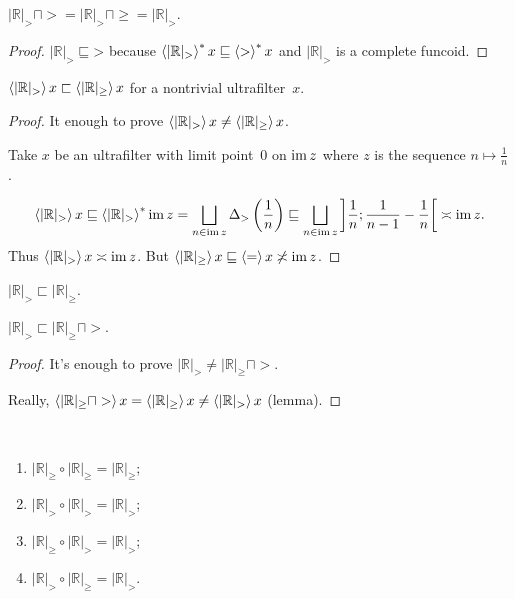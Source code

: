 \begin{prop}
$| \mathbb{R} |_{>} \sqcap > = | \mathbb{R} |_{>} \sqcap \geq = | \mathbb{R} |_{>}$.
\end{prop}

\begin{proof}
$| \mathbb{R} |_{>} \sqsubseteq \mathord{>}$ because $\left\langle | \mathbb{R} |_{>}\right\rangle ^{\ast} x \sqsubseteq \left\langle >\right\rangle ^{\ast} x$ and
$| \mathbb{R} |_{>}$ is a complete funcoid.
\end{proof}

\begin{lem}
$\left\langle  | \mathbb{R} |_{>} \right\rangle x \sqsubset \left\langle  | \mathbb{R} |_{\geq} \right\rangle x$ for a nontrivial ultrafilter~$x$.
\end{lem}

\begin{proof}
It enough to prove $\left\langle  | \mathbb{R} |_{>} \right\rangle x \ne \left\langle | \mathbb{R} |_{\geq} \right\rangle x$.

Take $x$ be an ultrafilter with limit point~$0$ on $\operatorname{im} z$ where $z$ is the sequence $n\mapsto \frac{1}{n}$.

\[ \supfun{ | \mathbb{R} |_{>} } x \sqsubseteq \rsupfun{ | \mathbb{R} |_{>} } \im z =
\bigsqcup_{n\in\im z} \Delta_{>}\left(\frac{1}{n}\right) \sqsubseteq
\bigsqcup_{n\in\im z} \left]\frac{1}{n};\frac{1}{n-1}-\frac{1}{n}\right[ \asymp \im z. \]
Thus $\left\langle  | \mathbb{R} |_{>} \right\rangle x \asymp \operatorname{im} z$. But
$\left\langle  | \mathbb{R} |_{\geq} \right\rangle x \sqsubseteq \left\langle =\right\rangle x \not\asymp \operatorname{im} z$.
\end{proof}

\begin{cor}
$| \mathbb{R} |_{>} \sqsubset | \mathbb{R} |_{\geq}$.
\end{cor}

\begin{prop}
$| \mathbb{R} |_{>} \sqsubset | \mathbb{R} |_{\geq} \sqcap >$.
\end{prop}

\begin{proof}
It's enough to prove $| \mathbb{R} |_{>} \neq | \mathbb{R} |_{\geq} \sqcap >$.

Really, $\left\langle  | \mathbb{R} |_{\geq} \sqcap > \right\rangle x = \left\langle  | \mathbb{R}
|_{\geq} \right\rangle x \neq \left\langle  | \mathbb{R} |_{>} \right\rangle x$ (lemma).
\end{proof}

\begin{prop}
~
\begin{enumerate}
\item\label{comp-ord-ge} $| \mathbb{R} |_{\geq} \circ | \mathbb{R} |_{\geq} = | \mathbb{R} |_{\geq}$;
\item\label{comp-ord-gt} $| \mathbb{R} |_{>} \circ | \mathbb{R} |_{>} = | \mathbb{R} |_{>}$;
\item $| \mathbb{R} |_{\geq} \circ | \mathbb{R} |_{>} = | \mathbb{R} |_{>}$;
\item $| \mathbb{R} |_{>} \circ | \mathbb{R} |_{\geq} = | \mathbb{R} |_{>}$.
\end{enumerate}  
\end{prop}

